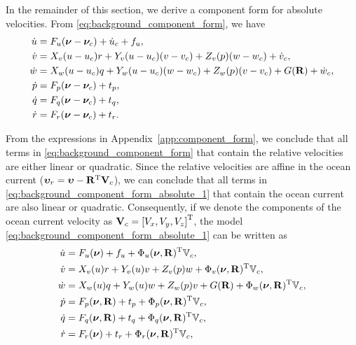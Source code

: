 In the remainder of this section, we derive a component form for absolute velocities.
From \eqref{eq:background_component_form}, we have
\begin{subequations}
    \begin{align}
        \dot{u} &= F_u(\bm{\nu} - \bm{\nu}_c) + \dot{u}_c + f_u, \\
        \dot{v} &= X_v(u - u_c)r + Y_v(u - u_c)(v - v_c) + Z_v(p)(w - w_c) + \dot{v}_c, \\
        \dot{w} &= X_w(u - u_c)q + Y_w(u - u_c)(w - w_c) + Z_w(p)(v - v_c) + G(\mathbf{R}) + \dot{w}_c, \\
        \dot{p} &= F_p(\bm{\nu} - \bm{\nu}_c) + t_p, \\
        \dot{q} &= F_q(\bm{\nu} - \bm{\nu}_c) + t_q, \\
        \dot{r} &= F_r(\bm{\nu} - \bm{\nu}_c) + t_r.
    \end{align}
    \label{eq:background_component_form_absolute_1}
\end{subequations}%

From the expressions in Appendix~\ref{app:component_form}, we conclude that all terms in \eqref{eq:background_component_form} that contain the relative velocities are either linear or quadratic.
Since the relative velocities are affine in the ocean current ($\bm{\upsilon}_r = \bm{\upsilon} - \mathbf{R}^{\mathrm{T}}\mathbf{V}_c$), we can conclude that all terms in \eqref{eq:background_component_form_absolute_1} that contain the ocean current are also linear or quadratic. 
Consequently, if we denote the components of the ocean current velocity as $\mathbf{V}_c = \left[V_x, V_y, V_z\right]^{\mathrm{T}}$, the model \eqref{eq:background_component_form_absolute_1} can be written as
\begin{subequations}
    \begin{align}
        \dot{u} &= F_u(\bm{\nu}) + f_u + \Phi_u(\bm{\nu}, \mathbf{R})^{\mathrm{T}}\mathbb{V}_c, \\
        \dot{v} &= X_v(u)r + Y_v(u)v + Z_v(p)w + \Phi_v(\bm{\nu}, \mathbf{R})^{\mathrm{T}}\mathbb{V}_c, \\
        \dot{w} &= X_w(u)q + Y_w(u)w + Z_w(p)v + G(\mathbf{R}) + \Phi_w(\bm{\nu}, \mathbf{R})^{\mathrm{T}}\mathbb{V}_c, \\
        \dot{p} &= F_p(\bm{\nu}, \mathbf{R}) + t_p + \Phi_p(\bm{\nu}, \mathbf{R})^{\mathrm{T}}\mathbb{V}_c, \\
        \dot{q} &= F_q(\bm{\nu}, \mathbf{R}) + t_q + \Phi_q(\bm{\nu}, \mathbf{R})^{\mathrm{T}}\mathbb{V}_c, \\
        \dot{r} &= F_r(\bm{\nu}) + t_r + \Phi_r(\bm{\nu}, \mathbf{R})^{\mathrm{T}}\mathbb{V}_c,
    \end{align}
    \label{eq:background_component_form_absolute_2}
\end{subequations}

